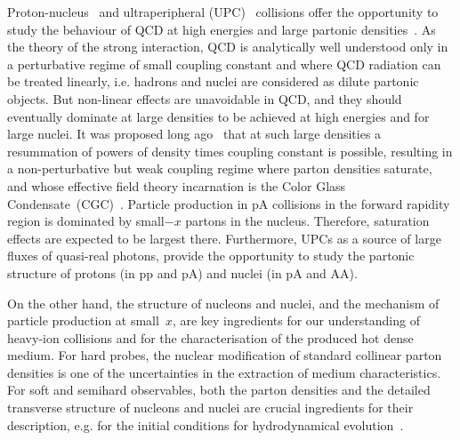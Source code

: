 \documentclass[../report.tex]{subfiles}
\begin{document}
Proton-nucleus~\cite{Salgado:2011wc} and ultraperipheral (UPC)~\cite{Baltz:2007kq} collisions offer the opportunity to study the behaviour of QCD at high energies and large partonic densities~\cite{Kovchegov:2012mbw}. 
As the theory of the strong interaction, QCD is analytically well understood only in a perturbative regime of small coupling constant and where QCD radiation can be treated linearly, i.e. hadrons and nuclei are considered as dilute partonic objects. 
But non-linear effects are unavoidable in QCD, and they should eventually dominate at large densities to be achieved at high energies and for large nuclei. 
It was proposed long ago~\cite{Gribov:1984tu,Mueller:1985wy} that at such large densities a resummation of powers of density times coupling constant is possible, resulting in a non-perturbative but weak coupling regime where parton densities saturate, and whose effective field theory incarnation is the Color Glass Condensate~(CGC)~\cite{Gelis:2010nm}.
Particle production in pA collisions in the forward rapidity region is dominated by small$-x$ partons in the nucleus. 
Therefore, saturation effects are expected to be largest there. Furthermore, UPCs as a source of large fluxes of quasi-real photons, provide the opportunity to study the partonic structure of protons (in pp and pA) and nuclei (in pA and AA).

On the other hand, the structure of nucleons and nuclei, and the mechanism of particle production at small~$x$, are key ingredients for our understanding of heavy-ion collisions and for the characterisation of the produced hot dense medium. 
For hard probes, the nuclear modification of standard collinear parton densities is one of the uncertainties in the extraction of medium characteristics. 
For soft and semihard observables, both the parton densities and the detailed transverse structure of nucleons and nuclei are crucial ingredients for their description, e.g. for the initial conditions for hydrodynamical evolution~\cite{Liu:2015nwa,Weller:2017tsr,Mantysaari:2017cni}.
\end{document}
